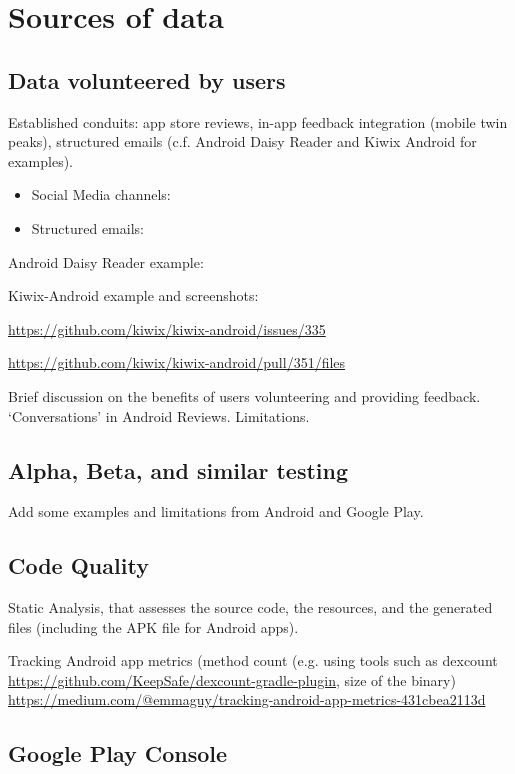 \chapter{Sources of data}

\section{Data volunteered by users}
Established conduits: app store reviews, in-app feedback integration (mobile twin peaks), structured emails (c.f. Android Daisy Reader and Kiwix Android for examples).
\begin{itemize}
    \item Social Media channels:
    \item Structured emails:
\end{itemize}

Android Daisy Reader example:

Kiwix-Android example and screenshots:

\url{https://github.com/kiwix/kiwix-android/issues/335}

\url{https://github.com/kiwix/kiwix-android/pull/351/files}

Brief discussion on the benefits of users volunteering and providing feedback. `Conversations' in Android Reviews. Limitations.

\section{Alpha, Beta, and similar testing}
Add some examples and limitations from Android and Google Play.

\section{Code Quality}
Static Analysis, that assesses the source code, the resources, and the generated files (including the APK file for Android apps). 

Tracking Android app metrics (method count (e.g. using tools such as dexcount \url{https://github.com/KeepSafe/dexcount-gradle-plugin}, size of the binary) \url{https://medium.com/@emmaguy/tracking-android-app-metrics-431cbea2113d}


\section{Google Play Console}
